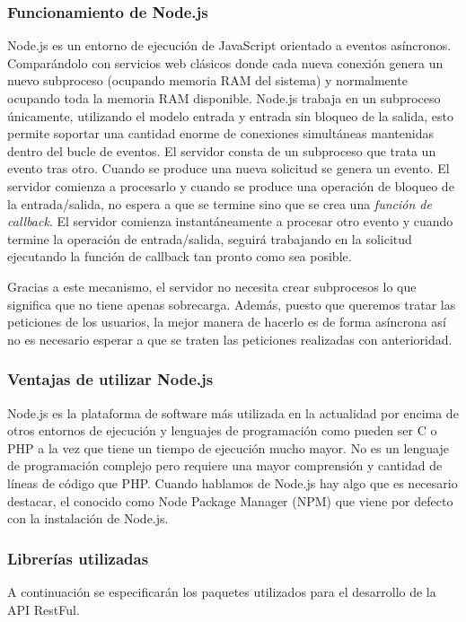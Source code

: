\subsubsection{Funcionamiento de Node.js}

Node.js es un entorno de ejecución de JavaScript \cite{javascript} orientado a eventos asíncronos. Comparándolo con servicios web clásicos donde cada nueva conexión genera un nuevo subproceso (ocupando memoria RAM del sistema) y normalmente ocupando toda la memoria RAM disponible. Node.js trabaja en un subproceso únicamente, utilizando el modelo entrada y entrada sin bloqueo de la salida, esto permite soportar una cantidad enorme de conexiones simultáneas mantenidas dentro del bucle de eventos. El servidor consta de un subproceso que trata un evento tras otro.
Cuando se produce una nueva solicitud se genera un evento. El servidor comienza a procesarlo y cuando se produce una operación de bloqueo de la entrada/salida, no espera a que se termine sino que se crea una \textit{función de callback}. El servidor comienza instantáneamente a procesar otro evento y cuando termine la operación de entrada/salida, seguirá trabajando en la solicitud ejecutando la función de callback tan pronto como sea posible.

Gracias a este mecanismo, el servidor no necesita crear subprocesos lo que significa que no tiene apenas sobrecarga. Además, puesto que queremos tratar las peticiones de los usuarios, la mejor manera de hacerlo es de forma asíncrona así no es necesario esperar a que se traten las peticiones realizadas con anterioridad.


\subsubsection{Ventajas de utilizar Node.js}

Node.js es la plataforma de software más utilizada en la actualidad por encima de otros entornos de ejecución y lenguajes de programación como pueden ser C o PHP a la vez que tiene un tiempo de ejecución mucho mayor. No es un lenguaje de programación complejo pero requiere una mayor comprensión y cantidad de líneas de código que PHP. Cuando hablamos de Node.js hay algo que es necesario destacar, el conocido como Node Package Manager (NPM) que viene por defecto con la instalación de Node.js.


\subsubsection{Librerías utilizadas}A continuación se especificarán los paquetes utilizados para el desarrollo de la API RestFul.

